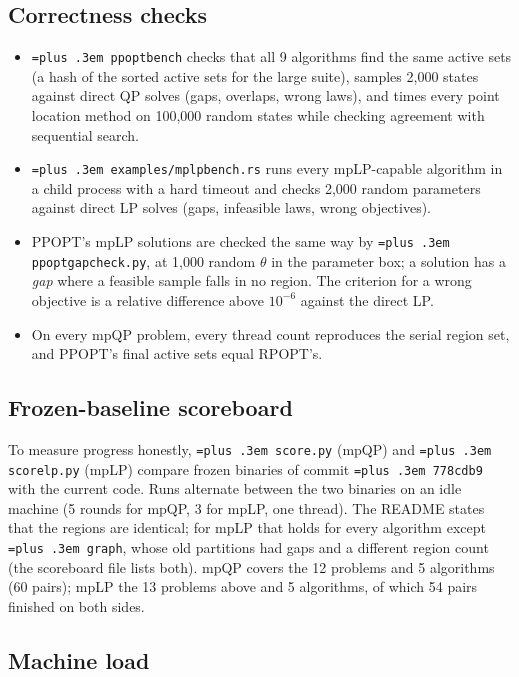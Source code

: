 \documentclass[10pt,a4paper]{article}
\newcommand{\rpopt}{RPOPT}
\newcommand{\ppopt}{PPOPT}
\newcommand{\code}[1]{{\let\_\bu\texttt{\spaceskip=\fontdimen2\font plus .3em #1}}}
\newcommand{\bu}{\textunderscore\hspace{0pt}}
\begin{document}
\subsection{Correctness checks}

\begin{itemize}
  \item \code{ppopt\_bench} checks that all 9 algorithms find the same active sets (a hash of the sorted active sets for the large suite), samples 2,000
    states against direct QP solves (gaps, overlaps, wrong laws), and times every point location method on 100,000 random states
    while checking agreement with sequential search.
  \item \code{examples/mplp\_bench.rs} runs every mpLP-capable algorithm in a child process with a hard timeout and checks 2,000 random parameters
    against direct LP solves (gaps, infeasible laws, wrong objectives).
  \item \ppopt{}'s mpLP solutions are checked the same way by \code{ppopt\_gapcheck.py}, at 1,000 random $\theta$ in the parameter box; a solution
    has a \emph{gap} where a feasible sample falls in no region. The criterion for a wrong objective is a relative difference above
    $10^{-6}$ against the direct LP.
  \item On every mpQP problem, every thread count reproduces the serial region set, and \ppopt{}'s final active sets equal \rpopt{}'s.
\end{itemize}

\subsection{Frozen-baseline scoreboard}

To measure progress honestly, \code{score.py} (mpQP) and \code{score\_lp.py} (mpLP) compare frozen binaries of commit \code{778cdb9} with the current
code. Runs alternate between the two binaries on an idle machine (5 rounds for mpQP, 3 for mpLP, one thread). The README states that the regions are identical; for mpLP that holds
for every algorithm except \code{graph}, whose old partitions had gaps and a different region count (the scoreboard file lists both). mpQP covers the 12 problems and 5 algorithms (60 pairs); mpLP the 13 problems above and 5 algorithms, of which 54
pairs finished on both sides.

\subsection{Machine load}
\label{sec:load}
\end{document}
